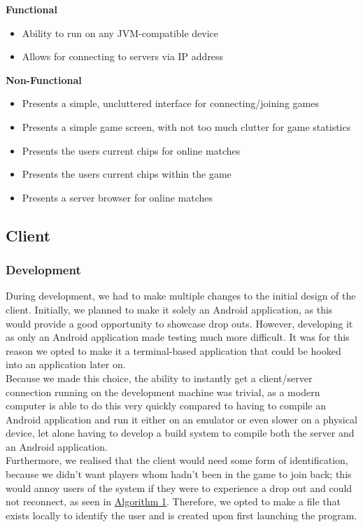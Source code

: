 \documentclass[11pt]{article}
\begin{document}
\textbf{Functional}
\begin{itemize}
	\item Ability to run on any JVM-compatible device
	\item Allows for connecting to servers via IP address
\end{itemize}

\textbf{Non-Functional}
\begin{itemize}
	\item Presents a simple, uncluttered interface for connecting/joining games
	\item Presents a simple game screen, with not too much clutter for game statistics
	\item Presents the users current chips for online matches
	\item Presents the users current chips within the game
	\item Presents a server browser for online matches
\end{itemize}

\newpage



\subsection{Client}
\subsubsection{Development}

During development, we had to make multiple changes to the initial design of the client. Initially, we planned to make it solely an Android application, as this would provide a good opportunity to showcase drop outs. However, developing it as only an Android application made testing much more difficult. It was for this reason we opted to make it a terminal-based application that could be hooked into an application later on. \\

Because we made this choice, the ability to instantly get a client/server connection running on the development machine was trivial, as a modern computer is able to do this very quickly compared to having to compile an Android application and run it either on an emulator or even slower on a physical device, let alone having to develop a build system to compile both the server and an Android application. \\

Furthermore, we realised that the client would need some form of identification, because we didn't want players whom hadn't been in the game to join back; this would annoy users of the system if they were to experience a drop out and could not reconnect, as seen in \hyperlink{algorithm_identity}{Algorithm 1}. Therefore, we opted to make a file that exists locally to identify the user and is created upon first launching the program. \\
\end{document}
